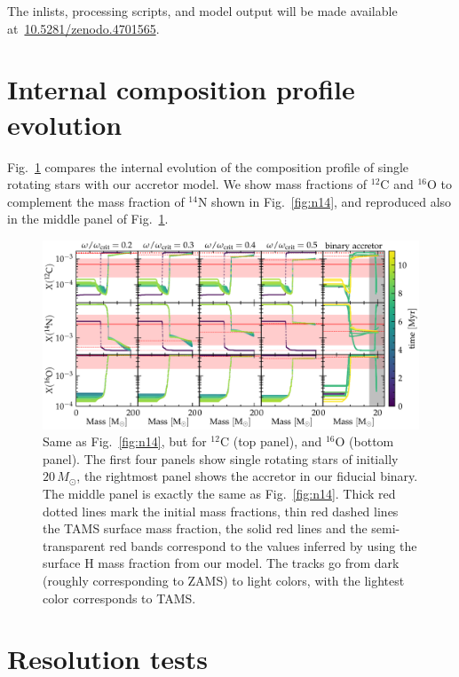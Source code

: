 \documentclass[twocolumn,twocolappendix,trackchanges]{aastex63}
\DeclareRobustCommand{\Figref}[1]{Fig.~\ref{#1}}
\begin{document}
The inlists, processing scripts, and model output will be made available at~\url{10.5281/zenodo.4701565}.

\section{Internal composition profile evolution}
\label{sec:X_fig}


\Figref{fig:composition_huge} compares the internal evolution of the composition
profile of single rotating stars with our accretor model.
We show mass fractions of $^{12}\mathrm{C}$  and $^{16}\mathrm{O}$ to complement the
mass fraction of $^{14}\mathrm{N}$ shown in \Figref{fig:n14}, and
reproduced also in the middle panel of \Figref{fig:composition_huge}.


\begin{figure}[hp]
  \centering
  \includegraphics[width=\textwidth]{huge_composition}
  \caption{Same as \Figref{fig:n14}, but for $^{12}\mathrm{C}$ (top
    panel), and $^{16}\mathrm{O}$ (bottom panel). The first four
    panels show single rotating stars of initially $20\,M_\odot$, the
    rightmost panel shows the accretor in our fiducial binary. The middle panel is
    exactly the same as \Figref{fig:n14}. Thick red dotted lines mark the
    initial mass fractions, thin red dashed lines the TAMS surface mass
    fraction, the solid red lines and the semi-transparent red bands
    correspond to the values inferred by 
    using the surface H mass fraction from our model. The tracks go
    from dark (roughly corresponding to ZAMS) to light colors, with the
    lightest color corresponds to TAMS.}
  \label{fig:composition_huge}
\end{figure}

\section{Resolution tests}
\label{sec:res_tests}
\end{document}
